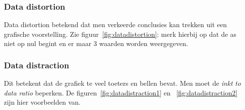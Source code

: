 \documentclass[a4paper,12pt]{article}
\begin{document}
\subsubsection{Data distortion}
Data distortion betekend dat men verkeerde conclusies kan trekken uit een grafische voorstelling.
Zie figuur~\ref{fig:datadistortion}: merk hierbij op dat de as niet op nul begint en er maar 3 waarden worden weergegeven.

\subsubsection{Data distraction}
Dit betekent dat de grafiek te veel toeters en bellen bevat.
Men moet de \textit{inkt to data ratio} beperken.
De figuren~\ref{fig:datadistraction1} en ~\ref{fig:datadistraction2} zijn hier voorbeelden van.
\end{document}
